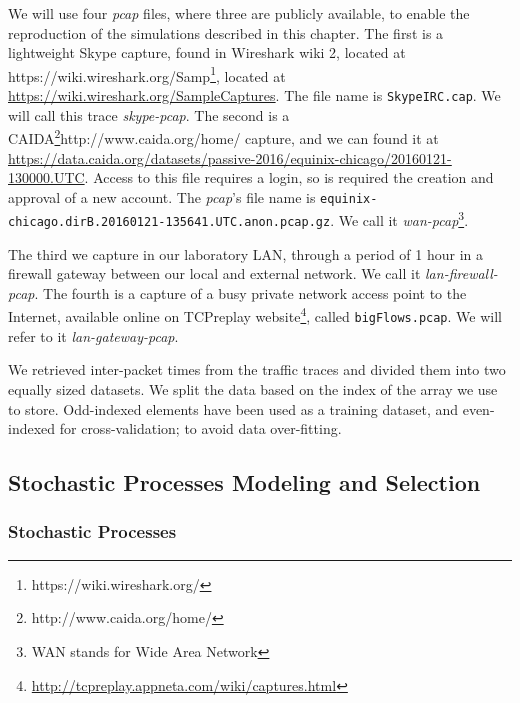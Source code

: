 We will use four \textit{pcap} files, where three are publicly available, to enable the reproduction of the simulations described in this chapter. The first is a lightweight Skype capture, found in Wireshark wiki 2, located at https://wiki.wireshark.org/Samp\footnote{https://wiki.wireshark.org/}, located  at \href{https://wiki.wireshark.org/SampleCaptures}{https://wiki.wireshark.org/SampleCaptures}. The file name is \texttt{SkypeIRC.cap}. We will call this trace \textit{skype-pcap}. The second is a CAIDA\footnote{http://www.caida.org/home/}{http://www.caida.org/home/} capture, and we can found it at \href{https://data.caida.org/datasets/passive-2016/equinix-chicago/20160121-130000.UTC}{https://data.caida.org/datasets/passive-2016/equinix-chicago/20160121-130000.UTC}. Access to this file requires a login, so is required the creation and approval of a new account.  The \textit{pcap}'s file name is \texttt{equinix-chicago.dirB.20160121-135641.UTC.anon.pcap.gz}. We call it \textit{wan-pcap}\footnote{\acrshort{WAN} stands for Wide Area Network}.

The third we capture in our laboratory \acrshort{LAN}, through a period of 1 hour in a firewall gateway between our local and external network. We call it \textit{lan-firewall-pcap}. The fourth is a capture of a busy private network access point to the Internet, available online on TCPreplay website\footnote{ \href{http://tcpreplay.appneta.com/wiki/captures.html}{http://tcpreplay.appneta.com/wiki/captures.html}}, called \texttt{bigFlows.pcap}. We will refer to it \textit{lan-gateway-pcap}.

We retrieved inter-packet times from the traffic traces and divided them into two equally sized datasets. We split the data based on the index of the array we use to store. Odd-indexed elements have been used as a training dataset, and even-indexed for cross-validation; to avoid data over-fitting.


\subsection{Stochastic Processes Modeling and Selection}


\subsubsection{Stochastic Processes}


